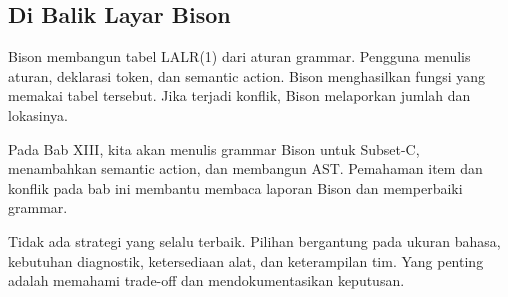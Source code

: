 \subsection{Di Balik Layar Bison}

Bison membangun tabel LALR(1) dari aturan grammar. Pengguna menulis
aturan, deklarasi token, dan semantic action. Bison menghasilkan
fungsi  yang memakai tabel tersebut. Jika terjadi
konflik, Bison melaporkan jumlah dan lokasinya.

Pada Bab XIII, kita akan menulis grammar Bison untuk Subset-C,
menambahkan semantic action, dan membangun AST. Pemahaman item dan
konflik pada bab ini membantu membaca laporan Bison dan memperbaiki
grammar.

\begin{infobox}
Tidak ada strategi yang selalu terbaik. Pilihan bergantung pada
ukuran bahasa, kebutuhan diagnostik, ketersediaan alat, dan
keterampilan tim. Yang penting adalah memahami trade-off dan
mendokumentasikan keputusan.
\end{infobox}
